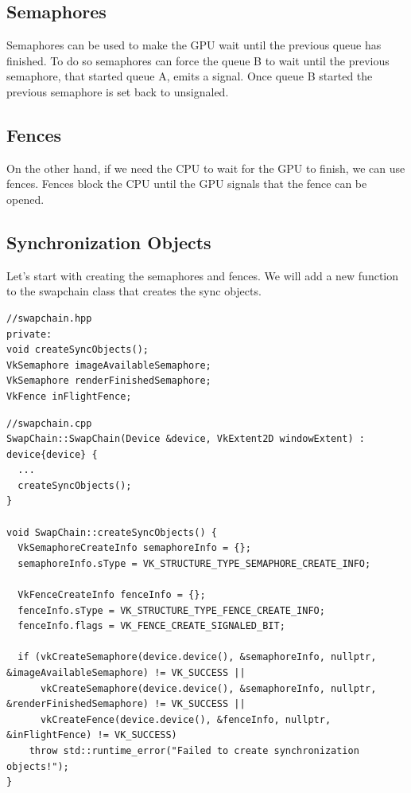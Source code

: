 \documentclass[12pt]{report} \usepackage{preamble}
\begin{document}
\subsection{Semaphores}

Semaphores can be used to make the GPU wait until the previous queue has finished. To do so semaphores can force the
queue B to wait until the previous semaphore, that started queue A, emits a signal. Once queue B started the previous semaphore
is set back to unsignaled.

\subsection{Fences}

On the other hand, if we need the CPU to wait for the GPU to finish, we can use fences. Fences block the CPU until the GPU
signals that the fence can be opened.

\subsection{Synchronization Objects}

Let's start with creating the semaphores and fences. We will add a new function to the swapchain class that creates the sync objects.

\begin{lstlisting}[Language=C++]
//swapchain.hpp
private:
void createSyncObjects();
VkSemaphore imageAvailableSemaphore;
VkSemaphore renderFinishedSemaphore;
VkFence inFlightFence;
\end{lstlisting}

\begin{lstlisting}[Language=C++]
//swapchain.cpp
SwapChain::SwapChain(Device &device, VkExtent2D windowExtent) : device{device} {
  ...
  createSyncObjects();
}

void SwapChain::createSyncObjects() {
  VkSemaphoreCreateInfo semaphoreInfo = {};
  semaphoreInfo.sType = VK_STRUCTURE_TYPE_SEMAPHORE_CREATE_INFO;

  VkFenceCreateInfo fenceInfo = {};
  fenceInfo.sType = VK_STRUCTURE_TYPE_FENCE_CREATE_INFO;
  fenceInfo.flags = VK_FENCE_CREATE_SIGNALED_BIT;

  if (vkCreateSemaphore(device.device(), &semaphoreInfo, nullptr, &imageAvailableSemaphore) != VK_SUCCESS ||
      vkCreateSemaphore(device.device(), &semaphoreInfo, nullptr, &renderFinishedSemaphore) != VK_SUCCESS ||
      vkCreateFence(device.device(), &fenceInfo, nullptr, &inFlightFence) != VK_SUCCESS)
    throw std::runtime_error("Failed to create synchronization objects!");
}
\end{lstlisting}
\end{document}
